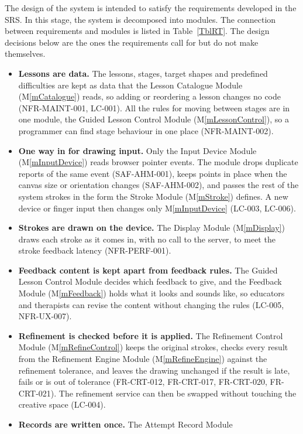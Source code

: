 \documentclass[12pt, titlepage]{article}
\newcommand{\mref}[1]{M\ref{#1}}
\begin{document}
The design of the system is intended to satisfy the requirements developed in
the SRS. In this stage, the system is decomposed into modules. The connection
between requirements and modules is listed in Table~\ref{TblRT}. The design
decisions below are the ones the requirements call for but do not make
themselves.

\begin{itemize}
\item \textbf{Lessons are data.} The lessons, stages, target shapes and
  predefined difficulties are kept as data that the Lesson Catalogue Module
  (\mref{mCatalogue}) reads, so adding or reordering a lesson changes no code
  (NFR-MAINT-001, LC-001). All the rules for moving between stages are in one
  module, the Guided Lesson Control Module (\mref{mLessonControl}), so a
  programmer can find stage behaviour in one place (NFR-MAINT-002).
\item \textbf{One way in for drawing input.} Only the Input Device Module
  (\mref{mInputDevice}) reads browser pointer events. The module drops duplicate
  reports
  of the same event (SAF-AHM-001), keeps points in place when the canvas size or
  orientation changes (SAF-AHM-002), and passes the rest of the system strokes
  in the form the Stroke Module (\mref{mStroke}) defines. A new device or finger
  input then changes only \mref{mInputDevice} (LC-003, LC-006).
\item \textbf{Strokes are drawn on the device.} The Display Module
  (\mref{mDisplay}) draws each stroke as it comes in, with no call to the
  server, to meet the stroke feedback latency (NFR-PERF-001).
\item \textbf{Feedback content is kept apart from feedback rules.} The Guided
  Lesson Control Module decides which feedback to give, and the Feedback Module
  (\mref{mFeedback}) holds what it looks and sounds like, so educators and
  therapists can revise the content without changing the rules (LC-005,
  NFR-UX-007).
\item \textbf{Refinement is checked before it is applied.} The Refinement
  Control Module (\mref{mRefineControl}) keeps the original strokes, checks
  every
  result from the Refinement Engine Module (\mref{mRefineEngine}) against the
  refinement tolerance, and leaves the drawing unchanged if the result is late,
  fails or is out of tolerance (FR-CRT-012, FR-CRT-017, FR-CRT-020,
  FR-CRT-021). The refinement service can then be swapped without touching the
  creative space (LC-004).
\item \textbf{Records are written once.} The Attempt Record Module

\end{itemize}
\end{document}
